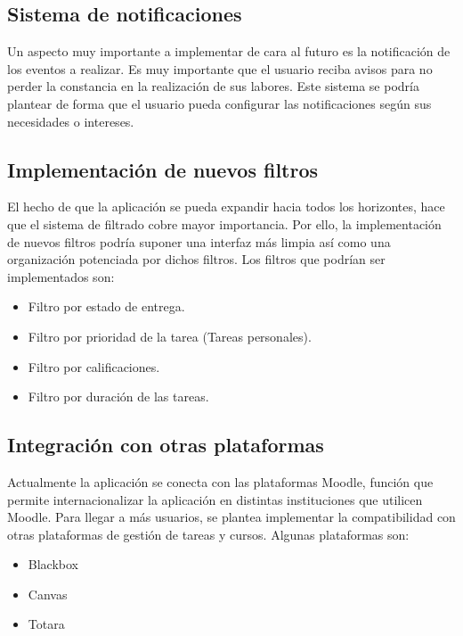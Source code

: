 \subsection{Sistema de notificaciones}
Un aspecto muy importante a implementar de cara al futuro es la notificación de los eventos a realizar. Es muy importante que el usuario reciba avisos para no perder la constancia en la realización de sus labores. Este sistema se podría plantear de forma que el usuario pueda configurar las notificaciones según sus necesidades o intereses.

\subsection{Implementación de nuevos filtros}
El hecho de que la aplicación se pueda expandir hacia todos los horizontes, hace que el sistema de filtrado cobre mayor importancia. Por ello, la implementación de nuevos filtros podría suponer una interfaz más limpia así como una organización potenciada por dichos filtros. Los filtros que podrían ser implementados son:
\begin{itemize}
    \item Filtro por estado de entrega.
    \item Filtro por prioridad de la tarea (Tareas personales).
    \item Filtro por calificaciones.
    \item Filtro por duración de las tareas.
\end{itemize}

\subsection{Integración con otras plataformas}
Actualmente la aplicación se conecta con las plataformas Moodle, función que permite internacionalizar la aplicación en distintas instituciones que utilicen Moodle. Para llegar a más usuarios, se plantea implementar la compatibilidad con otras plataformas de gestión de tareas y cursos. Algunas plataformas son:
\begin{itemize}
    \item Blackbox
    \item Canvas
    \item Totara
\end{itemize}
